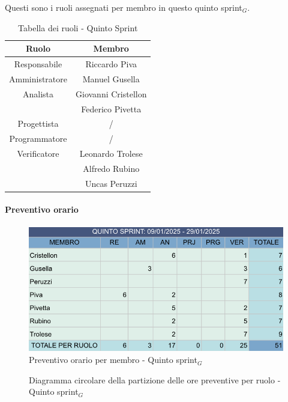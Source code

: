 \documentclass[10pt]{article}
\begin{document}
{{{{{{    Questi sono i ruoli assegnati per membro in questo quinto sprint$_G$.\\
    \begin{table}[H]
        \centering
        \begin{tabular}{|c|c|}
        \hline
        \rowcolor{gray!25}
        \textbf{Ruolo} & \textbf{Membro}\\
        \hline
        Responsabile & Riccardo Piva\\
        \hline
        Amministratore & Manuel Gusella \\ 
        \hline
        Analista & Giovanni Cristellon \\
        & Federico Pivetta \\
        \hline
        Progettista & / \\
        \hline
        Programmatore & / \\
        \hline
        Verificatore & Leonardo Trolese \\
        & Alfredo Rubino \\
        & Uncas Peruzzi \\
        \hline
        \end{tabular}
        \caption{Tabella dei ruoli - Quinto Sprint}
    \end{table}

    \paragraph{Preventivo orario}\mbox{}\vspace{0.4em}
    \begin{figure}[H]
    	\centering
    	\includegraphics[width=0.6\linewidth]{preventivoOreQuintoSprint.PNG}
    	\caption{Preventivo orario per membro - Quinto sprint$_G$}
    	\label{fig:Preventivo orario per membro - Quinto sprint$_G$}
    \end{figure}

    \begin{figure}[H]
        \centering
        \caption{Diagramma circolare della partizione delle ore preventive per ruolo - Quinto sprint$_G$ }
        \label{fig:Diagramma circolare della partizione delle ore preventive per ruolo - Quinto sprint$_G$}
    \end{figure}
    
}}}}}}
\end{document}
